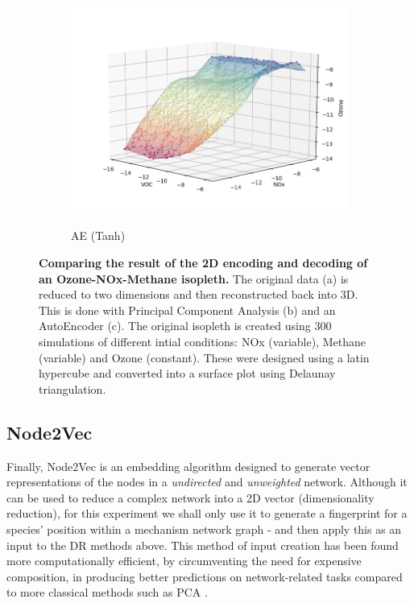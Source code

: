 \begin{figure}[H]
\begin{subfigure}{.33\textwidth}
  \includegraphics[width=\textwidth]{4fig/rae.png}
  \label{fig:iae}
  \caption{AE (Tanh)}
\end{subfigure}%
\caption{
\textbf{Comparing the result of the 2D encoding and decoding of an Ozone-NOx-Methane isopleth.} The original data (a) is reduced to two dimensions and then reconstructed back into 3D. This is done with Principal Component Analysis (b) and an AutoEncoder (c). The original isopleth is created using  300 simulations of different 
 intial conditions: NOx (variable), Methane (variable) and Ozone (constant). These were designed using a latin hypercube and converted into a surface plot using Delaunay triangulation. }
\label{fig:aeiso}
\end{figure}

\subsection{Node2Vec}\label{sec:n2v}
Finally, Node2Vec is an embedding algorithm designed to generate vector representations of the nodes in a \textit{undirected} and \textit{unweighted} network. Although it can be used to reduce a complex network into a 2D vector (dimensionality reduction), for this experiment we shall only use it to generate a fingerprint for a species' position within a mechanism network graph - and then apply this as an input to the DR methods above. This method of input creation has been found more computationally efficient, by circumventing the need for expensive composition, in producing better predictions on network-related tasks compared to more classical methods such as PCA \citep{node2vec}.


